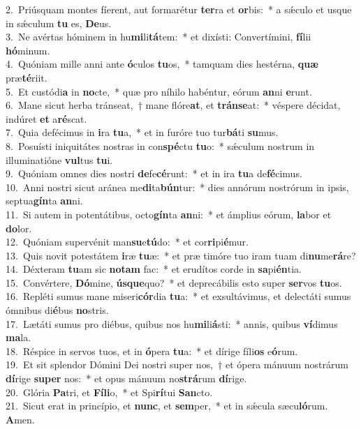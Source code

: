 {2.~}Priúsquam montes fíerent, aut formarétur \textbf{ter}ra et \textbf{or}bis:~* a sǽculo et usque in sǽculum \textbf{tu} es, \textbf{De}us.\\
{3.~}Ne avértas hóminem in hu\textbf{mi}li\textbf{tá}tem:~* et dixísti: Convertímini, \textbf{fí}lii \textbf{hó}minum.\\
{4.~}Quóniam mille anni ante \textbf{ó}culos \textbf{tu}os,~* tamquam dies hestérna, \textbf{quæ} præ\textbf{té}riit.\\
{5.~}Et custódi\textbf{a} in \textbf{no}cte,~* quæ pro níhilo habéntur, eórum \textbf{an}ni \textbf{e}runt.\\
{6.~}Mane sicut herba tránseat,~† mane flóre\textbf{at}, et \textbf{trán}\textbf{se}at:~* véspere décidat, indúret \textbf{et} a\textbf{ré}scat.\\
{7.~}Quia defécimus in \textbf{i}ra \textbf{tu}a,~* et in furóre tuo tur\textbf{bá}ti \textbf{su}mus.\\
{8.~}Posuísti iniquitátes nostras in con\textbf{spé}ctu \textbf{tu}o:~* sǽculum nostrum in illuminatióne \textbf{vul}tus \textbf{tu}i.\\
{9.~}Quóniam omnes dies nostri \textbf{de}fe\textbf{cé}runt:~* et in ira \textbf{tu}a de\textbf{fé}cimus.\\
{10.~}Anni nostri sicut aránea me\textbf{di}ta\textbf{bún}tur:~* dies annórum nostrórum in ipsis, septua\textbf{gín}ta \textbf{an}ni.\\
{11.~}Si autem in potentátibus, octo\textbf{gín}ta \textbf{an}ni:~* et ámplius eórum, \textbf{la}bor et \textbf{do}lor.\\
{12.~}Quóniam supervénit man\textbf{su}e\textbf{tú}do:~* et cor\textbf{ri}pi\textbf{é}mur.\\
{13.~}Quis novit potestátem \textbf{i}ræ \textbf{tu}æ:~* et præ timóre tuo iram tuam di\textbf{nu}me\textbf{rá}re?\\
{14.~}Déxteram \textbf{tu}am sic \textbf{no}\textbf{tam} fac:~* et erudítos corde in \textbf{sa}pi\textbf{én}tia.\\
{15.~}Convértere, \textbf{Dó}mine, \textbf{ús}\textbf{que}quo?~* et deprecábilis esto super \textbf{ser}vos \textbf{tu}os.\\
{16.~}Repléti sumus mane miseri\textbf{cór}dia \textbf{tu}a:~* et exsultávimus, et delectáti sumus ómnibus di\textbf{é}bus \textbf{no}stris.\\
{17.~}Lætáti sumus pro diébus, quibus nos hu\textbf{mi}li\textbf{á}sti:~* annis, quibus \textbf{ví}dimus \textbf{ma}la.\\
{18.~}Réspice in servos tuos, et in \textbf{ó}pera \textbf{tu}a:~* et dírige fíli\textbf{os} e\textbf{ó}rum.\\
{19.~}Et sit splendor Dómini Dei nostri super nos,~† et ópera mánuum nostrárum \textbf{dí}rige \textbf{su}\textbf{per} nos:~* et opus mánuum no\textbf{strá}rum \textbf{dí}rige.\\
{20.~}Glória \textbf{Pa}tri, et \textbf{Fí}\textbf{li}o,~* et Spi\textbf{rí}tui \textbf{San}cto.\\
{21.~}Sicut erat in princípio, et \textbf{nunc}, et \textbf{sem}per,~* et in sǽcula sæcu\textbf{ló}rum. \textbf{A}men.\\
